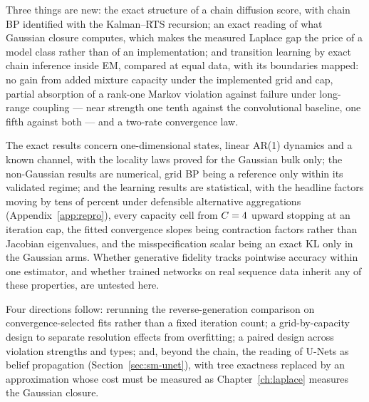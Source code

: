 Three things are new: the exact structure of a chain diffusion score, with
chain BP identified with the Kalman--RTS recursion; an exact reading of what
Gaussian closure computes, which makes the measured Laplace gap the price of
a model class rather than of an implementation; and transition learning by
exact chain inference inside EM, compared at equal data, with its boundaries
mapped: no gain from added mixture capacity under the implemented grid and
cap, partial absorption of a rank-one Markov violation against failure under
long-range coupling --- near strength one tenth against the convolutional
baseline, one fifth against both --- and a two-rate convergence law.

The exact results concern one-dimensional states, linear AR(1) dynamics and
a known channel, with the locality laws proved for the Gaussian bulk only;
the non-Gaussian results are numerical, grid BP being a reference only
within its validated regime; and the learning results are statistical, with
the headline factors moving by tens of percent under defensible alternative
aggregations (Appendix~\ref{app:repro}), every capacity cell from
$C = 4$ upward stopping at an iteration cap, the fitted convergence
slopes being contraction factors rather than Jacobian eigenvalues, and the
misspecification scalar being an exact KL only in the Gaussian arms. Whether
generative fidelity tracks pointwise accuracy within one estimator, and
whether trained networks on real sequence data inherit any of these
properties, are untested here.

Four directions follow: rerunning the reverse-generation comparison on
convergence-selected fits rather than a fixed iteration count; a
grid-by-capacity design to separate resolution effects from overfitting; a
paired design across violation strengths and types; and, beyond the chain, the reading of
U-Nets as belief propagation (Section~\ref{sec:sm-unet}), with tree
exactness replaced by an approximation whose cost must be measured as
Chapter~\ref{ch:laplace} measures the Gaussian closure.
